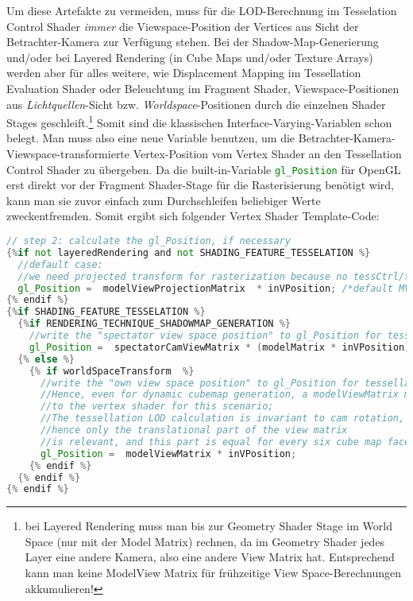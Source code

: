 	Um diese Artefakte zu vermeiden, muss für die LOD-Berechnung im Tesselation Control Shader
	\emph{immer} die Viewspace-Position der Vertices aus Sicht der Betrachter-Kamera zur Verfügung stehen.
	Bei der Shadow-Map-Generierung und/oder bei Layered Rendering (in Cube Maps und/oder Texture Arrays)
	werden aber für alles weitere, wie Displacement Mapping im Tessellation Evaluation Shader oder Beleuchtung
	im Fragment Shader, Viewspace-Positionen aus \emph{Lichtquellen}-Sicht bzw. \emph{Worldspace}-Positionen durch die
	einzelnen Shader Stages geschleift.\footnote{bei Layered Rendering muss man bis zur Geometry Shader Stage im 
	World Space (nur mit der Model Matrix) rechnen, da im Geometry Shader jedes Layer eine andere Kamera, also eine andere 
	View Matrix hat. Entsprechend kann  man keine ModelView Matrix für frühzeitige View Space-Berechnungen akkumulieren!}
	Somit sind die klassischen Interface-Varying-Variablen schon belegt.
	Man muss also eine neue Variable benutzen, um die Betrachter-Kamera- Viewspace-transformierte Vertex-Position
	vom Vertex Shader an den Tessellation Control Shader zu übergeben. Da die built-in-Variable
	\lstinline[language=GLSL]|gl_Position| für OpenGL erst direkt vor der Fragment Shader-Stage für die Rasterisierung
	benötigt wird, kann man sie zuvor einfach zum Durchschleifen beliebiger Werte zweckentfremden. Somit ergibt sich
	folgender Vertex Shader Template-Code:
	\begin{lstlisting}[language=GLSL]
// step 2: calculate the gl_Position, if necessary 
{%if not layeredRendering and not SHADING_FEATURE_TESSELATION %} 
  //default case:
  //we need projected transform for rasterization because no tessCtrl/tessEval/geom shader follows the vertex shader;
  gl_Position =  modelViewProjectionMatrix  * inVPosition; /*default MVP transform*/   
{% endif %} 
{%if SHADING_FEATURE_TESSELATION %} 
  {%if RENDERING_TECHNIQUE_SHADOWMAP_GENERATION %}
    //write the "spectator view space position" to gl_Position for tessellation LOD calculations 
    gl_Position =  spectatorCamViewMatrix * (modelMatrix * inVPosition);
  {% else %}
    {% if worldSpaceTransform  %}
      //write the "own view space position" to gl_Position for tessellation LOD calculations; 
      //Hence, even for dynamic cubemap generation, a modelViewMatrix must be passed 
      //to the vertex shader for this scenario;
      //The tessellation LOD calculation is invariant to cam rotation, 
      //hence only the translational part of the view matrix
      //is relevant, and this part is equal for every six cube map faces;
      gl_Position =  modelViewMatrix * inVPosition;
    {% endif %}
  {% endif %}
{% endif %}
	\end{lstlisting}
	
